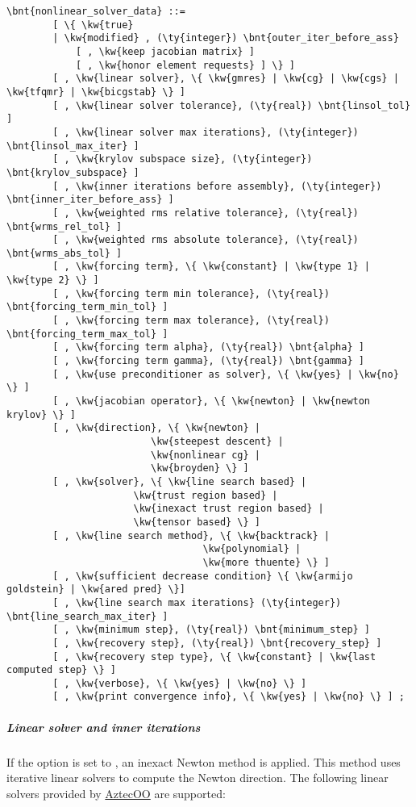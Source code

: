 \begin{Verbatim}[commandchars=\\\{\}]
    \bnt{nonlinear_solver_data} ::=
        [ \{ \kw{true}
        | \kw{modified} , (\ty{integer}) \bnt{outer_iter_before_ass}
            [ , \kw{keep jacobian matrix} ]
            [ , \kw{honor element requests} ] \} ]
        [ , \kw{linear solver}, \{ \kw{gmres} | \kw{cg} | \kw{cgs} | \kw{tfqmr} | \kw{bicgstab} \} ]
        [ , \kw{linear solver tolerance}, (\ty{real}) \bnt{linsol_tol} ]
        [ , \kw{linear solver max iterations}, (\ty{integer}) \bnt{linsol_max_iter} ]
        [ , \kw{krylov subspace size}, (\ty{integer}) \bnt{krylov_subspace} ]
        [ , \kw{inner iterations before assembly}, (\ty{integer}) \bnt{inner_iter_before_ass} ]
        [ , \kw{weighted rms relative tolerance}, (\ty{real}) \bnt{wrms_rel_tol} ]
        [ , \kw{weighted rms absolute tolerance}, (\ty{real}) \bnt{wrms_abs_tol} ]
        [ , \kw{forcing term}, \{ \kw{constant} | \kw{type 1} | \kw{type 2} \} ]
        [ , \kw{forcing term min tolerance}, (\ty{real}) \bnt{forcing_term_min_tol} ]
        [ , \kw{forcing term max tolerance}, (\ty{real}) \bnt{forcing_term_max_tol} ]
        [ , \kw{forcing term alpha}, (\ty{real}) \bnt{alpha} ]
        [ , \kw{forcing term gamma}, (\ty{real}) \bnt{gamma} ]
        [ , \kw{use preconditioner as solver}, \{ \kw{yes} | \kw{no} \} ]
        [ , \kw{jacobian operator}, \{ \kw{newton} | \kw{newton krylov} \} ]
        [ , \kw{direction}, \{ \kw{newton} |
                         \kw{steepest descent} |
                         \kw{nonlinear cg} |
                         \kw{broyden} \} ]
        [ , \kw{solver}, \{ \kw{line search based} |
                      \kw{trust region based} |
                      \kw{inexact trust region based} |
                      \kw{tensor based} \} ]
        [ , \kw{line search method}, \{ \kw{backtrack} |
                                  \kw{polynomial} |
                                  \kw{more thuente} \} ]
        [ , \kw{sufficient decrease condition} \{ \kw{armijo goldstein} | \kw{ared pred} \}]
        [ , \kw{line search max iterations} (\ty{integer}) \bnt{line_search_max_iter} ]
        [ , \kw{minimum step}, (\ty{real}) \bnt{minimum_step} ]
        [ , \kw{recovery step}, (\ty{real}) \bnt{recovery_step} ]
        [ , \kw{recovery step type}, \{ \kw{constant} | \kw{last computed step} \} ]
        [ , \kw{verbose}, \{ \kw{yes} | \kw{no} \} ]
        [ , \kw{print convergence info}, \{ \kw{yes} | \kw{no} \} ] ;
\end{Verbatim}
\subparagraph{Linear solver and inner iterations}
If the option  is set to , an inexact Newton method is applied. This method uses iterative linear solvers to compute the Newton direction. The following linear solvers provided by \href{https://trilinos.github.io/aztecoo.html}{AztecOO} are supported:
